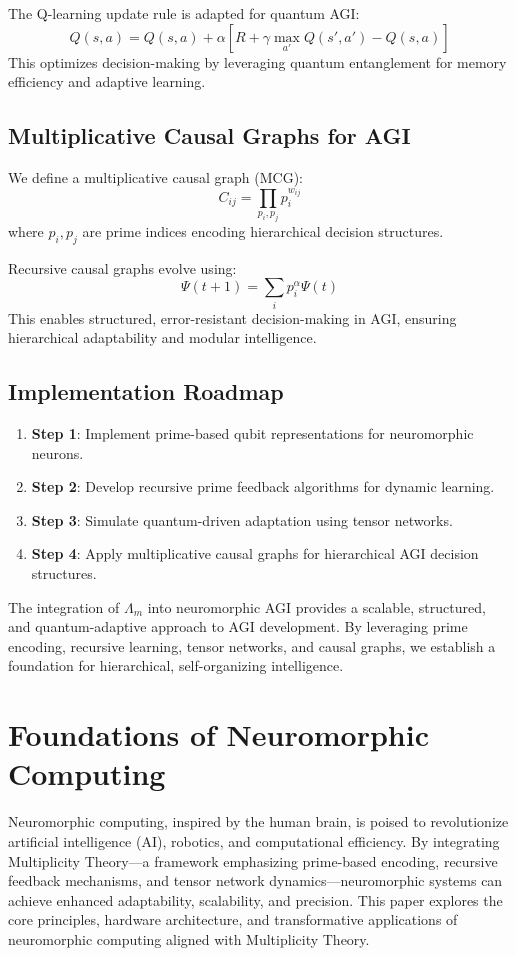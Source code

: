 \documentclass{article}
\theoremstyle{plain}
\begin{document}
\begin{itemize}
\begin{itemize}
The Q-learning update rule is adapted for quantum AGI:
\begin{equation}
Q(s, a) = Q(s, a) + \alpha \left[ R + \gamma \max_{a'} Q(s', a') - Q(s, a) \right]
\end{equation}
This optimizes decision-making by leveraging quantum entanglement for memory efficiency and adaptive learning.

\subsection{Multiplicative Causal Graphs for AGI}
We define a multiplicative causal graph (MCG):
\begin{equation}
C_{ij} = \prod_{p_i, p_j} p_i^{w_{ij}}
\end{equation}
where $p_i, p_j$ are prime indices encoding hierarchical decision structures.

Recursive causal graphs evolve using:
\begin{equation}
\Psi(t+1) = \sum_i p_i^\alpha \Psi(t)
\end{equation}
This enables structured, error-resistant decision-making in AGI, ensuring hierarchical adaptability and modular intelligence.

\subsection{Implementation Roadmap}
\begin{enumerate}
    \item \textbf{Step 1}: Implement prime-based qubit representations for neuromorphic neurons.
    \item \textbf{Step 2}: Develop recursive prime feedback algorithms for dynamic learning.
    \item \textbf{Step 3}: Simulate quantum-driven adaptation using tensor networks.
    \item \textbf{Step 4}: Apply multiplicative causal graphs for hierarchical AGI decision structures.
\end{enumerate}

The integration of $\Lambda_m$ into neuromorphic AGI provides a scalable, structured, and quantum-adaptive approach to AGI development. By leveraging prime encoding, recursive learning, tensor networks, and causal graphs, we establish a foundation for hierarchical, self-organizing intelligence.

\section{Foundations of Neuromorphic Computing}
Neuromorphic computing, inspired by the human brain, is poised to revolutionize artificial intelligence (AI), robotics, and computational efficiency. By integrating Multiplicity Theory—a framework emphasizing prime-based encoding, recursive feedback mechanisms, and tensor network dynamics—neuromorphic systems can achieve enhanced adaptability, scalability, and precision. This paper explores the core principles, hardware architecture, and transformative applications of neuromorphic computing aligned with Multiplicity Theory.




\end{itemize}
\end{itemize}
\end{document}
